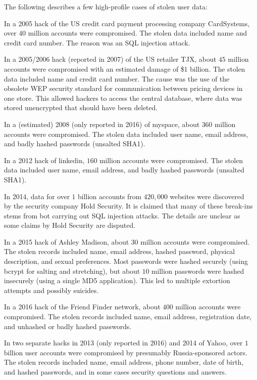 The following describes a few high-profile cases of stolen user data:
\begin{compactitem}
\item In a 2005 hack of the US credit card payment processing company CardSystems, over $40$ million accounts were compromised.
The stolen data included name and credit card number.
The reason was an SQL injection attack.

\item In a 2005/2006 hack (reported in 2007) of the US retailer TJX, about $45$ million accounts were compromised with an estimated damage of \$$1$ billion.
The stolen data included name and credit card number.
The cause was the use of the obsolete WEP security standard for communication between pricing devices in one store.
This allowed hackers to access the central database, where data was stored unencrypted that should have been deleted.

\item In a (estimated) 2008 (only reported in 2016) of myspace, about $360$ million accounts were compromised.
The stolen data included user name, email address, and badly hashed passwords (unsalted SHA1).

\item In a 2012 hack of linkedin, $160$ million accounts were compromised.
The stolen data included user name, email address, and badly hashed passwords (unsalted SHA1).

\item In 2014, data for over $1$ billion accounts from $420,000$ websites were discovered by the security company Hold Security.
It is claimed that many of these break-ins stems from bot carrying out SQL injection attacks.
The details are unclear as some claims by Hold Security are disputed.

\item In a 2015 hack of Ashley Madison, about $30$ million accounts were compromised.
The stolen records included name, email address, hashed password, physical description, and sexual preferences.
Most passwords were hashed securely (using bcrypt for salting and stretching), but about $10$ million passwords were hashed insecurely (using a single MD5 application).
This led to multiple extortion attempts and possibly suicides.

\item In a 2016 hack of the Friend Finder network, about $400$ million accounts were compromised.
The stolen records included name, email address, registration date, and unhashed or badly hashed passwords.

\item In two separate hacks in 2013 (only reported in 2016) and 2014 of Yahoo, over $1$ billion user accounts were compromised by presumably Russia-sponsored actors.
The stolen records included name, email address, phone number, date of birth, and hashed passwords, and in some cases security questions and answers.
\end{compactitem}

